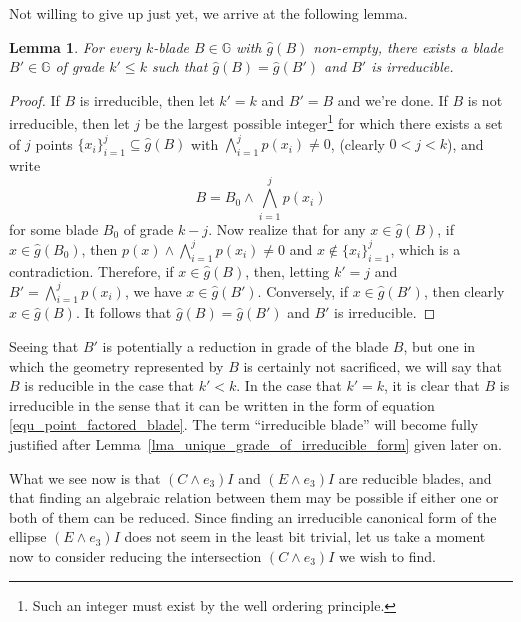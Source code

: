 \documentclass{birkjour}
\newtheorem{lem}[thm]{Lemma}
\theoremstyle{definition}
\theoremstyle{remark}
\numberwithin{equation}{section}
\newcommand{\G}{\mathbb{G}}
\newcommand{\gh}{\hat{g}}
\begin{document}
Not willing to give up just yet, we arrive at the following lemma.

\begin{lem}\label{lma_irreducible_form_exists}
For every $k$-blade $B\in\G$ with $\gh(B)$ non-empty, there exists a blade $B'\in\G$ of grade $k'\leq k$
such that $\gh(B)=\gh(B')$ and $B'$ is irreducible.
\end{lem}
\begin{proof}
If $B$ is irreducible, then let $k'=k$ and $B'=B$ and we're done.
If $B$ is not irreducible, then let $j$ be the largest possible integer\footnote{Such an
integer must exist by the well ordering principle.}
for which there exists a set of $j$ points $\{x_i\}_{i=1}^j\subseteq\gh(B)$
with $\bigwedge_{i=1}^j p(x_i)\neq 0$, (clearly $0<j<k$), and write
\begin{equation*}
B = B_0\wedge\bigwedge_{i=1}^j p(x_i)
\end{equation*}
for some blade $B_0$ of grade $k-j$.  Now realize that for any $x\in\gh(B)$,
if $x\in\gh(B_0)$, then $p(x)\wedge\bigwedge_{i=1}^j p(x_i)\neq 0$ and $x\not\in\{x_i\}_{i=1}^j$,
which is a contradiction.  Therefore, if $x\in\gh(B)$, then, letting $k'=j$ and $B'=\bigwedge_{i=1}^jp(x_i)$,
we have $x\in\gh(B')$.  Conversely, if $x\in\gh(B')$, then clearly $x\in\gh(B)$.  It follows that
$\gh(B)=\gh(B')$ and $B'$ is irreducible.
\end{proof}

Seeing that $B'$ is potentially a reduction in grade of the blade $B$, but one
in which the geometry represented by $B$ is certainly not sacrificed,
we will say that $B$ is reducible
in the case that $k'<k$.  In the case that $k'=k$, it is clear that $B$ is irreducible
in the sense that it can be written in the form of equation \eqref{equ_point_factored_blade}.
The term ``irreducible blade'' will become fully justified after
Lemma~\ref{lma_unique_grade_of_irreducible_form} given later on.

What we see now is that $(C\wedge e_3)I$ and $(E\wedge e_3)I$ are reducible blades,
and that finding an algebraic relation between them may be possible if either
one or both of them can be reduced.  Since finding an
irreducible canonical form of the ellipse $(E\wedge e_3)I$
does not seem in the least bit trivial, let us take a moment now to consider reducing the
intersection $(C\wedge e_3)I$ we wish to find.
\end{document}

